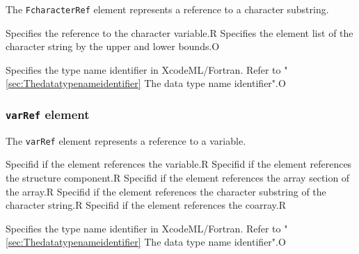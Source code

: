 The {\tt FcharacterRef} element represents a reference to a character substring.


\begin{XcodeMLChildElements}
{Specifies the reference to the character variable.}{R}
{Specifies the element list of the character string by the upper and lower bounds.}{O}
\end{XcodeMLChildElements}

\begin{XcodeMLAttributes}
{Specifies the type name identifier in XcodeML/Fortran.
 Refer to "\ref{sec:Thedatatypenameidentifier} The data type name identifier".}{O}
\end{XcodeMLAttributes}


\subsubsection{ {\tt varRef} element}

The {\tt varRef} element represents a reference to a variable.


\begin{XcodeMLChildElements}
{Specifid if the element references the variable.}{R}
{Specifid if the element references the structure component.}{R}
{Specifid if the element references the array section of the array.}{R}
{Specifid if the element references the character substring of the character string.}{R}
{Specifid if the element references the coarray.}{R}
\end{XcodeMLChildElements}

\begin{XcodeMLAttributes}
{Specifies the type name identifier in XcodeML/Fortran.
 Refer to "\ref{sec:Thedatatypenameidentifier} The data type name identifier".}{O}
\end{XcodeMLAttributes}


